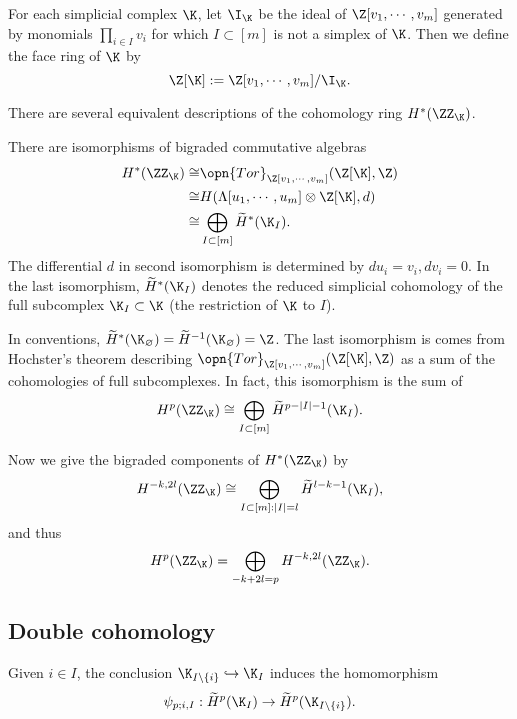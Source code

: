 For each simplicial complex $\K$, let $\I_{\K}$ be the ideal of $\Z[v_1,\cdots,v_m]$ generated by 
monomials $\prod_{i\in I} v_i$ for which $I\subset [m]$ is not
a simplex of $\K$. Then we define the face ring of $\K$ by
$$\Z[\K]:=\Z[v_1,\cdots,v_m]/\I_{\K}.$$

There are several equivalent descriptions of the cohomology ring
$H^*(\ZZ_{\K})$.

\begin{prop}
    \label{prop: cohomology ring of Zk}
    There are isomorphisms of bigraded commutative algebras
    \begin{equation*}
    \begin{split}
        H^*(\ZZ_{\K})\cong & \opn{Tor}_{\Z[v_1,\cdots,v_m]}(\Z[\K],\Z)\\
        \cong & H(\Lambda[u_1,\cdots,u_m]\otimes \Z[\K],d)\\
        \cong & \bigoplus_{I\subset [m]} \widetilde{H}^*(\K_I).
    \end{split} 
    \end{equation*}
    The differential $d$ in second isomorphism is determined by
    $du_i=v_i, dv_i=0$. 
    In the last isomorphism, $\widetilde{H}^*(\K_I)$
    denotes the reduced simplicial cohomology of the full subcomplex
    $\K_I\subset \K$ (the restriction of $\K$ to $I$).
\end{prop}
\begin{rem}
    In conventions, $\widetilde{H}^*(\K_{\varnothing})=\widetilde{H}^{-1}(\K_{\varnothing})=\Z$.
    The last isomorphism is comes from Hochster’s theorem describing 
    $\opn{Tor}_{\Z[v_1,\cdots,v_m]}(\Z[\K],\Z)$
    as a sum of the cohomologies of full subcomplexes. In fact,
    this isomorphism is the sum of
    \begin{equation*}
        H^p(\ZZ_{\K})\cong \bigoplus_{I\subset [m]} 
        \widetilde{H}^{p-|I|-1}(\K_I).
    \end{equation*}
\end{rem}

Now we give the bigraded components of $H^*(\ZZ_{\K})$ by
$$H^{-k,2l}(\ZZ_{\K})\cong \bigoplus_{I\subset [m]:|I|=l} 
        \widetilde{H}^{l-k-1}(\K_I),$$
and thus 
$$H^p(\ZZ_{\K})= \bigoplus_{-k+2l=p} H^{-k,2l}(\ZZ_{\K}).$$


\subsection{Double cohomology}
Given $i\in I$, the conclusion $\K_{I\setminus \{i\}}\hookrightarrow \K_I$
induces the homomorphism
$$\psi_{p;i,I}: \widetilde{H}^p(\K_I)\to
\widetilde{H}^p(\K_{I\setminus \{i\}}).$$

